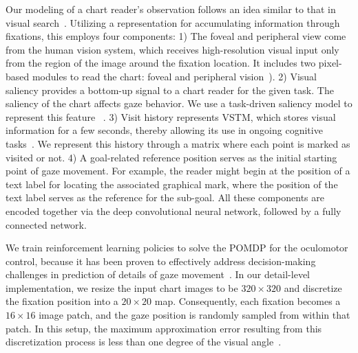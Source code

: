 Our modeling of a chart reader's observation follows an idea similar to that in visual search~\cite{yang2020predicting}. Utilizing a representation for accumulating information through fixations, this employs four components: 
1) The foveal and peripheral view come from the human vision system, which receives high-resolution visual input only from the region of the image around the fixation location. It includes two pixel-based modules to read the chart: foveal and peripheral vision~\cite{duchowski2018gaze}). 
2) Visual saliency provides a bottom-up signal to a chart reader for the given task. The saliency of the chart affects gaze behavior. We use a task-driven saliency model to represent this feature ~\cite{wang2024salchartqa}.
3)  Visit history represents VSTM, which stores visual information for a few seconds, thereby allowing its use in ongoing cognitive tasks~\cite{alvarez2004capacity}. We represent this history through a matrix where each point is marked as visited or not.
4) A goal-related reference position serves as the initial starting point of gaze movement. For example, the reader might begin at the position of a text label for locating the associated graphical mark, where the position of the text label serves as the reference for the sub-goal. 
All these components are encoded together via the deep convolutional neural network, followed by a fully connected network.

We train reinforcement learning policies to solve the POMDP for the oculomotor control, because it has been proven to effectively address decision-making challenges in prediction of details of gaze movement~\cite{yang2020predicting, jiang2024eyeformer, shi2024crtypist, bai2024heads}.
In our detail-level implementation, we resize the input chart images to be $320 \times 320$ and discretize the fixation position into a $20 \times 20$ map. Consequently, each fixation becomes a $16 \times 16$ image patch, and the gaze position is randomly sampled from within that patch. In this setup, the maximum approximation error resulting from this discretization process is less than one degree of the visual angle~\cite{yang2020predicting}.

\subsection{}
\label{sec:workflow}

